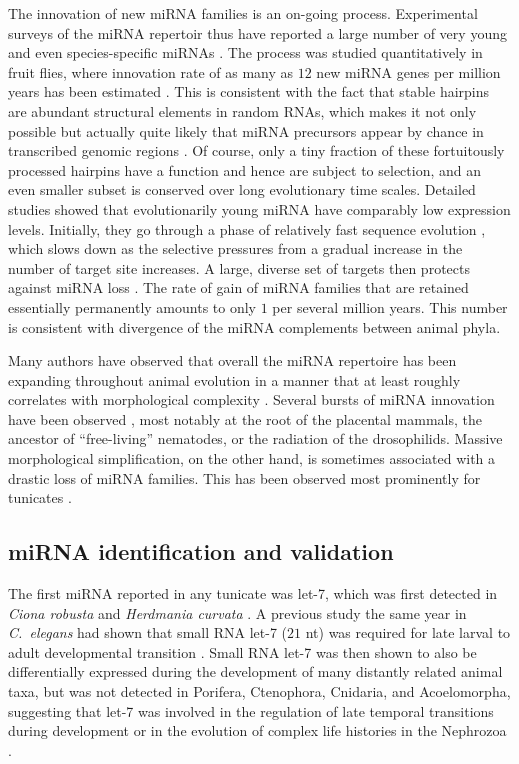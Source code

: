 \documentclass[graybox]{svmult}
\begin{document}
The innovation of new miRNA families is an on-going process. Experimental
surveys of the miRNA repertoir thus have reported a large number of very
young and even species-specific miRNAs \cite{Bentwich:05, Berezikov:06}. The
process was studied quantitatively in fruit flies, where innovation rate of
as many as $12$ new miRNA genes per million years has been estimated
\cite{Lu:08}. This is consistent with the fact that stable hairpins are
abundant structural elements in random RNAs, which makes it not only
possible but actually quite likely that miRNA precursors appear by chance
in transcribed genomic regions \cite{Tanzer:04a, CampoPaysaa:11, Marco:13}.
Of course, only a tiny fraction of these fortuitously processed hairpins
have a function and hence are subject to selection, and an even smaller
subset is conserved over long evolutionary time scales. Detailed studies
showed that evolutionarily young miRNA have comparably low expression
levels. Initially, they go through a phase of relatively fast sequence
evolution \cite{Liang:09, Meunier:12}, which slows down as the selective
pressures from a gradual increase in the number of target site increases. A
large, diverse set of targets then protects against miRNA loss
\cite{Lee:07a}. The rate of gain of miRNA families that are retained
essentially permanently amounts to only $1$ per several million years. This
number is consistent with divergence of the miRNA complements between
animal phyla.

Many authors have observed that overall the miRNA repertoire has been
expanding throughout animal evolution in a manner that at least roughly
correlates with morphological complexity \cite{Hertel:06a, Sempere:06,
  Niwa:07, Prochnik:07, Lee:07a, Heimberg:08, Peterson:09,
  Berezikov:11}. Several bursts of miRNA innovation have been observed
\cite{Hertel:06a, Heimberg:08, Tanzer:10a, Hertel:15a}, most notably at the
root of the placental mammals, the ancestor of ``free-living'' nematodes,
or the radiation of the drosophilids.  Massive morphological
simplification, on the other hand, is sometimes associated with a drastic
loss of miRNA families. This has been observed most prominently for
tunicates \cite{Fu:08, Dai:09}.

\subsection{miRNA identification and validation}

The first miRNA reported in any tunicate was let-7, which was 
first detected in \textit{Ciona robusta} and \textit{Herdmania curvata} 
\cite{Pasquinelli2000}. A previous study the same year in \textit{C.\ elegans} 
had shown that small RNA let-7 ($21$ nt) was required for late larval to adult 
developmental transition \cite{Reinhart:2000mz}. Small RNA let-7 was then shown 
to also be differentially expressed during the development of many distantly 
related animal taxa, but was not detected in Porifera, Ctenophora, Cnidaria, 
and Acoelomorpha, suggesting that let-7 was involved in the regulation of late 
temporal transitions during development or in the evolution of complex life 
histories in the Nephrozoa \cite{Pasquinelli2000,Pasquinelli2003}.
\end{document}
